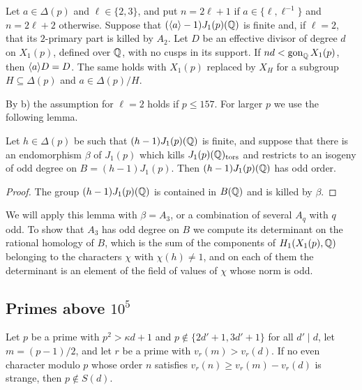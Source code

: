 \begin{proposition}\label{prop:DS41}
Let $a\in\Delta(p)$ and $\ell\in\{2,3\}$, and put $n=2\ell+1$ if $a\in\{\ell,\ell^{-1}\}$ and $n=2\ell+2$ otherwise. Suppose that $(\langle a\rangle-1)J_1(p)(\mathbb{Q})$ is finite and, if $\ell=2$, that its $2$-primary part is killed by $A_2$. Let $D$ be an effective divisor of degree $d$ on $X_1(p)$, defined over $\mathbb{Q}$, with no cusps in its support. If $nd<\operatorname{gon}_{\mathbb{Q}} X_1(p)$, then $\langle a\rangle D=D$. The same holds with $X_1(p)$ replaced by $X_H$ for a subgroup $H\subseteq\Delta(p)$ and $a\in\Delta(p)/H$.
\end{proposition}

By  b) the assumption for $\ell=2$ holds if $p\leq 157$. For larger $p$ we use the following lemma.

\begin{lemma}\label{lem:oddiso}
Let $h\in\Delta(p)$ be such that $(h-1)J_1(p)(\mathbb{Q})$ is finite, and suppose that there is an endomorphism $\beta$ of $J_1(p)$ which kills $J_1(p)(\mathbb{Q})_{\mathrm{tors}}$ and restricts to an isogeny of odd degree on $B=(h-1)J_1(p)$. Then $(h-1)J_1(p)(\mathbb{Q})$ has odd order.
\end{lemma}

\begin{proof}
The group $(h-1)J_1(p)(\mathbb{Q})$ is contained in $B(\mathbb{Q})$ and is killed by $\beta$.
\end{proof}

We will apply this lemma with $\beta=A_3$, or a combination of several $A_q$ with $q$ odd. To show that $A_3$ has odd degree on $B$ we compute its determinant on the rational homology of $B$, which is the sum of the components of $H_1(X_1(p),\mathbb{Q})$ belonging to the characters $\chi$ with $\chi(h)\neq1$, and on each of them the determinant is an element of the field of values of $\chi$ whose norm is odd.

\subsection{Primes above \texorpdfstring{$10^5$}{100000}}\label{sec:large}

\begin{lemma}\label{lem:screen}
Let $p$ be a prime with $p^2>\kappa d+1$ and $p\notin\{2d'+1,3d'+1\}$ for all $d'\mid d$, let $m=(p-1)/2$, and let $r$ be a prime with $v_r(m)>v_r(d)$. If no even character modulo $p$ whose order $n$ satisfies $v_r(n)\geq v_r(m)-v_r(d)$ is strange, then $p\notin S(d)$.
\end{lemma}

